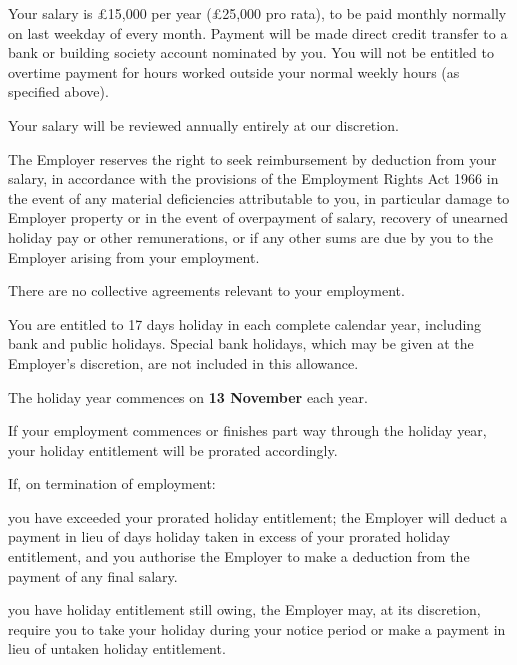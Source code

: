 \documentclass[a4paper,11pt,onecolumn ]{article}
\begin{document}
\begin{legal}
\item {}
\begin{legal}
\item Your salary is £15,000 per year (£25,000 pro rata), to be paid monthly normally on 
last weekday of every month. Payment will be made direct credit transfer to a bank or
building society account nominated by you. You will not be entitled to overtime
payment for hours worked outside your normal weekly hours (as specified
above).
\item Your salary will be reviewed annually entirely at our discretion.
\item The Employer reserves the right to seek reimbursement by deduction from your
salary, in accordance with the provisions of the Employment Rights Act 1966 in
the event of any material deficiencies attributable to you, in particular damage
to Employer property or in the event of overpayment of salary, recovery of
unearned holiday pay or other remunerations, or if any other sums are due by
you to the Employer arising from your employment.
\end{legal}


\item {}
There are no collective agreements relevant to your employment.

\item {}
\begin{legal}
\item You are entitled to 17 days holiday in each complete calendar year, 
including bank and public holidays. Special bank holidays, which may be given at the
Employer's discretion, are not included in this allowance. 
\item The holiday year commences on \textbf{13 November} each year.
\item If your employment commences or finishes part way through the holiday year,
your holiday entitlement will be prorated accordingly.

\item If, on termination of employment:

\begin{legal}
  \item you have exceeded your prorated holiday entitlement; the Employer will
  deduct a payment in lieu of days holiday taken in excess of your prorated
  holiday entitlement, and you authorise the Employer to make a deduction
  from the payment of any final salary.
  \item you have holiday entitlement still owing, the Employer may, at its
  discretion, require you to take your holiday during your notice period or
  make a payment in lieu of untaken holiday entitlement.
\end{legal}


\end{legal}
\end{legal}
\end{document}
